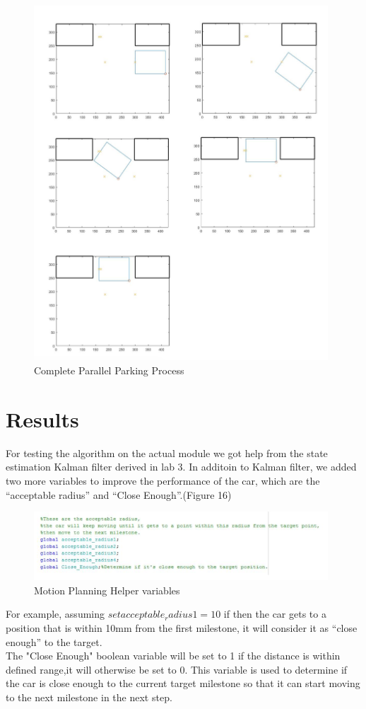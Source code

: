 \documentclass[12pt, letterpaper]{amsart} %
\numberwithin{equation}{section}
\begin{document}
\begin{figure}[h!]
\includegraphics[width=110mm]{fig_15.png}
\caption{Complete Parallel Parking Process}
\label{fig:figure15}	
\end{figure}
\newpage
\section{Results}
For testing the algorithm on the actual module we got help from the state estimation Kalman filter derived in lab 3. 
In additoin to Kalman filter, we added two more variables to improve the performance of the car, which are the “acceptable radius” and “Close Enough”.(Figure 16)
\begin{figure}[h!]
\includegraphics[width=110mm]{fig_16.png}
\caption{Motion Planning Helper variables}
\label{fig:figure16}	
\end{figure}

For example, assuming $set acceptable_radius1=10$ if then the car gets to a position that is within 
10mm from the first milestone, it will consider it
as “close enough” to the target.
\\ The "Close Enough" boolean variable will be set to 1 if the distance is within defined range,it will otherwise be set to 0. This 
variable is used to determine if the car is close 
enough to the current target milestone so that it can 
start moving to the next milestone in the next step.
\end{document}
